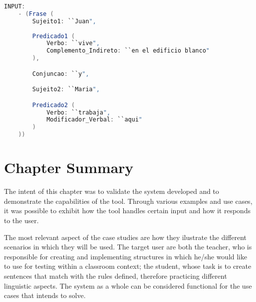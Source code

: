 \begin{center}
\begin{minipage}{12cm}
\begin{lstlisting}[language=java, basicstyle=\tiny, label={lst:example_complex_input2}, caption=Example of another more complex sentence input]
INPUT:
    - (Frase (
        Sujeito1: ``Juan",
		
        Predicado1 (
            Verbo: ``vive",
            Complemento_Indireto: ``en el edificio blanco"
        ),

        Conjuncao: ``y",

        Sujeito2: ``Maria",

        Predicado2 (
            Verbo: ``trabaja",
            Modificador_Verbal: ``aqui"
        )
    ))
\end{lstlisting}
\end{minipage}
\end{center}

%
%
%
%

\section{Chapter Summary}

The intent of this chapter was to validate the system developed and to demonstrate the capabilities of the tool.
Through various examples and use cases, it was possible to exhibit how the tool handles certain input and how it responds to the user.

The most relevant aspect of the case studies are how they ilustrate the different scenarios in which they will be used.
The target user are both the teacher, who is responsible for creating and implementing structures in which he/she would like to use for testing within a classroom context;
the student, whose task is to create sentences that match with the rules defined, therefore practicing different linguistic aspects.
The system as a whole can be considered functional for the use cases that intends to solve.


